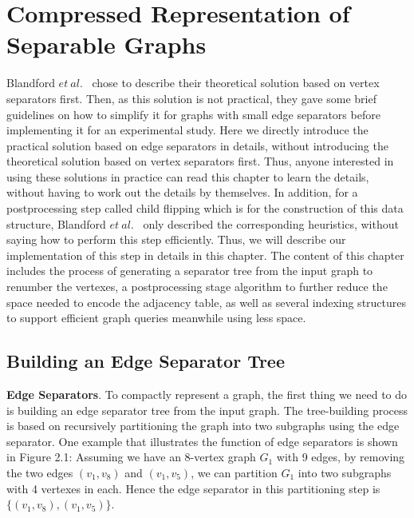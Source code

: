 \documentclass[12pt,glossary]{dalthesis}
\begin{document}
\chapter{Compressed Representation of Separable Graphs}

Blandford $et \ al.$~\cite{compact-representation} chose to describe their theoretical solution based on vertex separators first. Then, as this solution is not practical, they gave some brief guidelines on how to simplify it for graphs with small edge separators before implementing it for an experimental study. Here we directly introduce the practical solution based on edge separators in details, without introducing the theoretical solution based on vertex separators first. Thus, anyone interested in using these solutions in practice can read this chapter to learn the details, without having to work out the details by themselves. In addition, for a postprocessing step called child flipping which is for the construction of this data structure, Blandford $et \ al.$~\cite{compact-representation} only described the corresponding heuristics, without saying how to perform this step efficiently. Thus, we will describe our implementation of this step in details in this chapter. The content of this chapter includes the process of generating a separator tree from the input graph to renumber the vertexes, a postprocessing stage algorithm to further reduce the space needed to encode the adjacency table, as well as several indexing structures to support efficient graph queries meanwhile using less space.    


\section{Building an Edge Separator Tree}

\textbf{Edge Separators}. To compactly represent a graph, the first thing we need to do is building an edge separator tree from the input graph. The tree-building process is based on recursively partitioning the graph into two subgraphs using the edge separator. One example that illustrates the function of edge separators is shown in Figure 2.1: Assuming we have an 8-vertex graph $G_{1}$ with 9 edges, by removing the two edges $(v_{1}, v_{8})$ and $(v_{1}, v_{5})$, we can partition $G_{1}$ into two subgraphs with 4 vertexes in each. Hence the edge separator in this partitioning step is $\{(v_{1}, v_{8}),(v_{1}, v_{5}) \}$.

\bigskip
\end{document}
